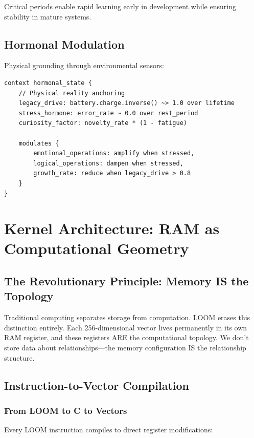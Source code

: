 \documentclass[12pt,a4paper,openany]{book} %
\begin{document}
Critical periods enable rapid learning early in development while ensuring stability in mature systems.

\section{Hormonal Modulation}

Physical grounding through environmental sensors:

\vspace{0.5em}
\begin{lstlisting}[language=loom]
context hormonal_state {
    // Physical reality anchoring
    legacy_drive: battery.charge.inverse() ~> 1.0 over lifetime
    stress_hormone: error_rate ↝ 0.0 over rest_period
    curiosity_factor: novelty_rate * (1 - fatigue)

    modulates {
        emotional_operations: amplify when stressed,
        logical_operations: dampen when stressed,
        growth_rate: reduce when legacy_drive > 0.8
    }
}
\end{lstlisting}
\vspace{0.5em}

\chapter{Kernel Architecture: RAM as Computational Geometry}

\section{The Revolutionary Principle: Memory IS the Topology}

Traditional computing separates storage from computation. LOOM erases this distinction entirely. Each 256-dimensional vector lives permanently in its own RAM register, and these registers ARE the computational topology. We don't store data about relationships—the memory configuration IS the relationship structure.

\section{Instruction-to-Vector Compilation}

\subsection{From LOOM to C to Vectors}

Every LOOM instruction compiles to direct register modifications:
\end{document}
